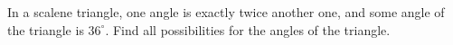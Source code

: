 In a scalene triangle, one angle is exactly twice another one, and some angle of the triangle is $36^\circ$. Find all possibilities for the angles of the triangle.
